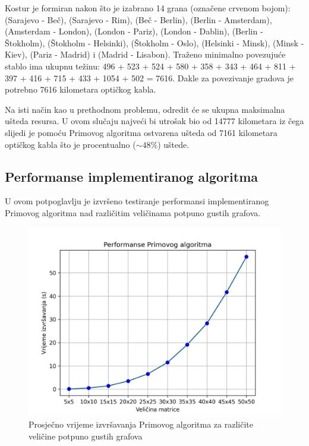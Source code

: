\documentclass[conference]{IEEEtran}
\begin{document}
Kostur je formiran nakon što je izabrano 14 grana (označene crvenom bojom): (Sarajevo - Beč), (Sarajevo - Rim), (Beč - Berlin), (Berlin - Amsterdam), (Amsterdam - London), (London - Pariz), (London - Dablin), (Berlin - Štokholm), (Štokholm - Helsinki), (Štokholm - Oslo), (Helsinki - Minsk), (Minsk - Kiev), (Pariz - Madrid) i (Madrid - Lisabon). Traženo minimalno povezujuće stablo ima ukupnu težinu: 496 + 523 + 524 + 580 + 358 + 343 + 464 + 811 + 397 + 416 + 715 + 433 + 1054 + 502 = 7616. Dakle za povezivanje gradova je potrebno 7616 kilometara optičkog kabla.

Na isti način kao u prethodnom problemu, odredit će se ukupna maksimalna ušteda resursa. U ovom slučaju najveći bi utrošak bio od 14777 kilometara iz čega slijedi je pomoću Primovog algoritma ostvarena ušteda od 7161 kilometara optičkog kabla što je procentualno ($\sim48\%$) uštede.


\subsection{Performanse implementiranog algoritma}

U ovom potpoglavlju je izvršeno testiranje performansi implementiranog Primovog algoritma nad različitim veličinama potpuno gustih grafova.

\begin{figure}[H]
\centering
\includegraphics[width=1\linewidth]{slike/performanse/prim-300dpi.jpg}
\caption{Prosječno vrijeme izvršavanja Primovog algoritma za različite veličine potpuno gustih grafova}
\label{figmat}
\end{figure}
\end{document}

